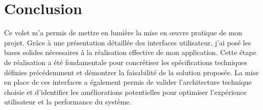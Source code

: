 \section*{Conclusion}
Ce volet m'a permis de mettre en lumière la mise en œuvre pratique de mon projet. Grâce à une présentation détaillée des interfaces utilisateur, j'ai posé les bases solides nécessaires à la réalisation effective de mon application. Cette étape de réalisation a été fondamentale pour concrétiser les spécifications techniques définies précédemment et démontrer la faisabilité de la solution proposée. La mise en place de ces interfaces a également permis de valider l'architecture technique choisie et d'identifier les améliorations potentielles pour optimiser l'expérience utilisateur et la performance du système.






